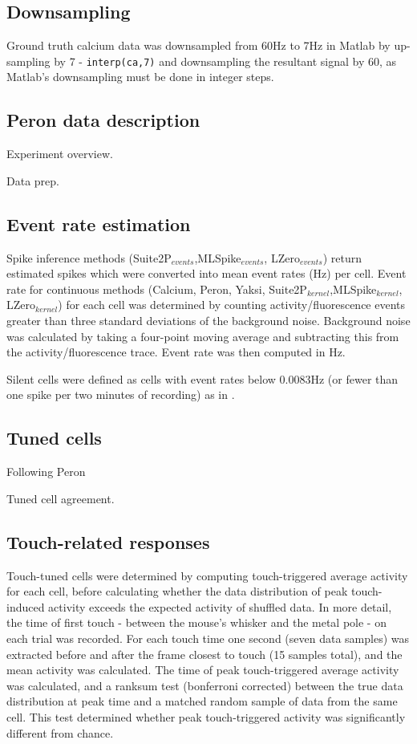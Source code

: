 \documentclass[a4paper,10pt,twocolumn]{article}
\begin{document}
\subsection*{Downsampling}
Ground truth calcium data was downsampled from 60Hz to 7Hz in Matlab by up-sampling by 7 - {\tt{interp(ca,7)}} and downsampling the resultant signal by 60, as Matlab's downsampling must be done in integer steps.

\subsection*{Peron data description}
Experiment overview. 

Data prep.

\subsection{Event rate estimation}
Spike inference methods (Suite2P$_{events}$,MLSpike$_{events}$, LZero$_{events}$) return estimated spikes which were converted into mean event rates (Hz) per cell. Event rate for continuous methods (Calcium, Peron, Yaksi, Suite2P$_{kernel}$,MLSpike$_{kernel}$, LZero$_{kernel}$) for each cell was determined by counting activity/fluorescence events greater than three standard deviations of the background noise. Background noise was calculated by taking a four-point moving average and subtracting this from the activity/fluorescence trace. Event rate was then computed in Hz.

Silent cells were defined as cells with event rates below 0.0083Hz (or fewer than one spike per two minutes of recording) as in \citep{OConnor2010-hd}.

\subsection{Tuned cells}
Following Peron

Tuned cell agreement.

\subsection{Touch-related responses}
Touch-tuned cells were determined by computing touch-triggered average activity for each cell, before calculating whether the data distribution of peak touch-induced activity exceeds the expected activity of shuffled data. In more detail, the time of first touch - between the mouse's whisker and the metal pole - on each trial was recorded. For each touch time one second (seven data samples) was extracted before and after the frame closest to touch (15 samples total), and the mean activity was calculated. The time of peak touch-triggered average activity was calculated, and a ranksum test (bonferroni corrected) between the true data distribution at peak time and a matched random sample of data from the same cell. This test determined whether peak touch-triggered activity was significantly different from chance. 
\end{document}
